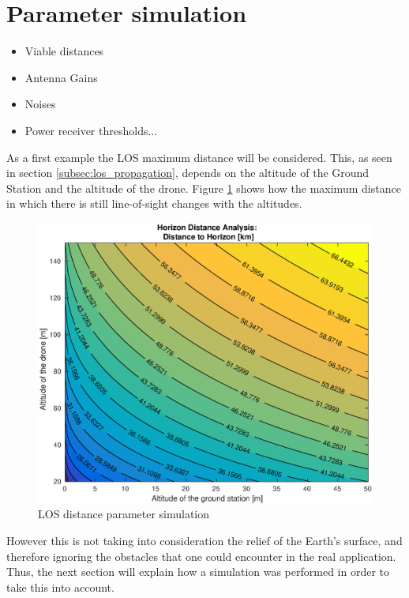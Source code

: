 \section{Parameter simulation}

\begin{itemize}
\item{Viable distances}
\item{Antenna Gains}
\item{Noises}
\item{Power receiver thresholds...}
\end{itemize}

As a first example the LOS maximum distance will be considered. This, as seen in section \ref{subsec:los_propagation}, depends on the altitude of the Ground Station and the altitude of the drone. Figure \ref{fig:altitude2distance} shows how the maximum distance in which there is still line-of-sight changes with the altitudes.

\begin{figure}[H]
	\centering
	\includegraphics[scale=0.70]{figures/altitude2distance.eps}
	\caption{LOS distance parameter simulation}
   	\label{fig:altitude2distance}
\end{figure}

However this is not taking into consideration the relief of the Earth's surface, and therefore ignoring the obstacles that one could encounter in the real application. Thus, the next section will explain how a simulation was performed in order to take this into account.
